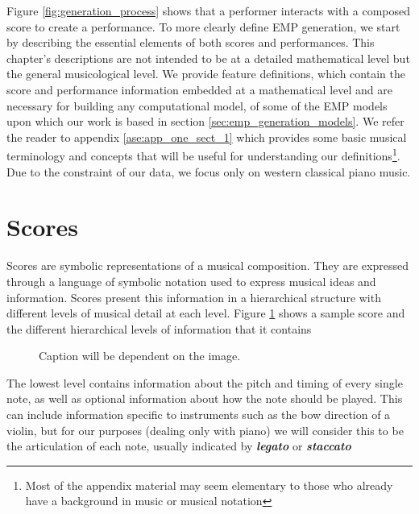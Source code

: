Figure \ref{fig:generation_process} shows that a performer interacts with a composed score to create a performance. To more clearly define EMP generation, we start by describing the essential elements of both scores and performances. This chapter's descriptions are not intended to be at a detailed mathematical level but the general musicological level. We provide feature definitions, which contain the score and performance information embedded at a mathematical level and are necessary for building any computational model, of some of the EMP models upon which our work is based in section \ref{sec:emp_generation_models}. We refer the reader to appendix \ref{ase:app_one_sect_1} which provides some basic musical terminology and concepts that will be useful for understanding our definitions\footnote{Most of the appendix material may seem elementary to those who already have a background in music or musical notation}. Due to the constraint of our data, we focus only on western classical piano music. 

\section{Scores}\label{sec:scores}
Scores are symbolic representations of a musical composition. They are expressed through a language of symbolic notation used to express musical ideas and information. Scores present this information in a hierarchical structure with different levels of musical detail at each level. Figure \ref{fig:score_hierarchy} shows a sample score and the different hierarchical levels of information that it contains

\begin{figure}
    \centering
    \caption{Caption will be dependent on the image.}
    \label{fig:score_hierarchy}
\end{figure}

\newcommand{\mnot}[1]{\textbf{\emph{#1}}}

The lowest level contains information about the pitch and timing of every single note, as well as optional information about how the note should be played. This can include information specific to instruments such as the bow direction of a violin, but for our purposes (dealing only with piano) we will consider this to be the articulation of each note, usually indicated by \mnot{legato} or \mnot{staccato} 

